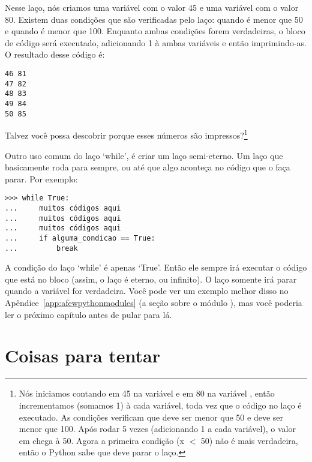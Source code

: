 Nesse laço, nós criamos uma variável  com o valor 45 e uma variável  com o valor 80. Existem duas condições que são verificadas pelo laço: quando  é menor que 50 e quando  é menor que 100. Enquanto ambas condições forem verdadeiras, o bloco de código será executado, adicionando 1 à ambas variáveis e então imprimindo-as. O resultado desse código é:

\begin{listing}
\begin{verbatim}
46 81
47 82
48 83
49 84
50 85
\end{verbatim}
\end{listing}

Talvez você possa descobrir porque esses números são impressos?\footnote{Nós iniciamos contando em 45 na variável  e em 80 na variável , então incrementamos (somamos 1) à cada variável, toda vez que o código no laço é executado. As condições verificam que  deve ser menor que 50 e  deve ser menor que 100.  Após rodar 5 vezes (adicionando 1 a cada variável), o valor em  chega à 50. Agora a primeira condição (x $<$ 50) não é mais verdadeira, então o Python sabe que deve parar o laço.}

Outro uso comum do laço `while', é criar um laço semi-eterno. Um laço que basicamente roda para sempre, ou até que algo aconteça no código que o faça parar. Por exemplo:

\begin{listingignore}
\begin{verbatim}
>>> while True:
...     muitos códigos aqui
...     muitos códigos aqui
...     muitos códigos aqui
...     if alguma_condicao == True:
...         break
\end{verbatim}
\end{listingignore}

A condição do laço `while' é apenas `True'. Então ele sempre irá executar o código que está no bloco (assim, o laço é eterno, ou infinito). O laço somente irá parar quando a variável  for verdadeira. Você pode ver um exemplo melhor disso no Apêndice~\ref{app:afewpythonmodules} (a seção sobre o módulo ), mas você poderia ler o próximo capítulo antes de pular para lá.

\section{Coisas para tentar}

